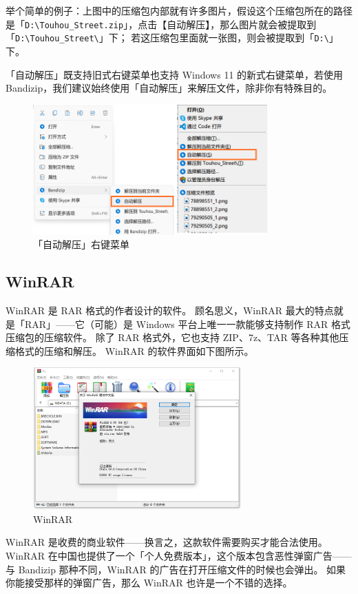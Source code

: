 举个简单的例子：上图中的压缩包内部就有许多图片，假设这个压缩包所在的路径是「\verb|D:\Touhou_Street.zip|」，点击【自动解压】，那么图片就会被提取到「\verb|D:\Touhou_Street\|」下；
若这压缩包里面就一张图，则会被提取到「\verb|D:\|」下。

「自动解压」既支持旧式右键菜单也支持 Windows 11 的新式右键菜单，若使用 Bandizip，我们建议始终使用「自动解压」来解压文件，除非你有特殊目的。

\begin{figure}[htb!]
  \centering
  \includegraphics[width=9cm]{assets/Auto_Decompress.jpg}
  \caption{「自动解压」右键菜单}
  \label{Auto_Decompress}
\end{figure}

\subsection{WinRAR}

WinRAR 是 RAR 格式的作者设计的软件。
顾名思义，WinRAR 最大的特点就是「RAR」——它（可能）是 Windows 平台上唯一一款能够支持制作 RAR 格式压缩包的压缩软件。
除了 RAR 格式外，它也支持 ZIP、7z、TAR 等各种其他压缩格式的压缩和解压。
WinRAR 的软件界面如下图所示。

\begin{figure}[htb!]
  \centering
  \includegraphics[width=8cm]{assets/WinRAR.png}
  \caption{WinRAR}
  \label{WinRAR}
\end{figure}

WinRAR 是收费的商业软件——换言之，这款软件需要购买才能合法使用。
WinRAR 在中国也提供了一个「个人免费版本」，这个版本包含恶性弹窗广告——与 Bandizip 那种不同，WinRAR 的广告在打开压缩文件的时候也会弹出。
如果你能接受那样的弹窗广告，那么 WinRAR 也许是一个不错的选择。


